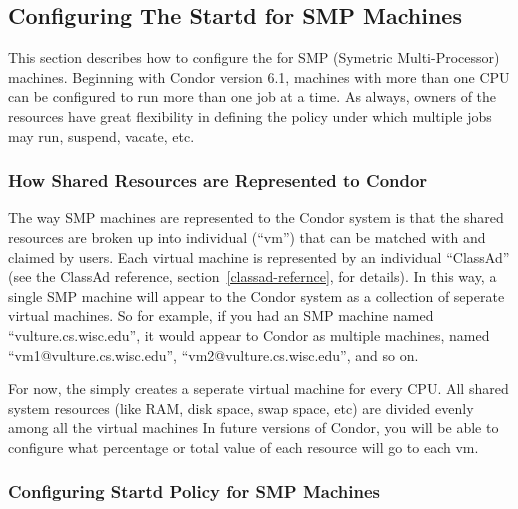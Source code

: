 \subsection{Configuring The Startd for SMP Machines}
\label{sec:Configuring-SMP}

This section describes how to configure the  for SMP
(Symetric Multi-Processor) machines.
Beginning with Condor version 6.1, machines with more than one CPU can
be configured to run more than one job at a time.
As always, owners of the resources have great flexibility in defining
the policy under which multiple jobs may run, suspend, vacate, etc.  

\subsubsection{How Shared Resources are Represented to Condor}
\label{sec:How-Resources-Represented}

The way SMP machines are represented to the Condor system is that
the shared resources are broken up into individual  (``vm'') that can be matched with and claimed by users.
Each virtual machine is represented by an individual ``ClassAd''
(see the ClassAd reference, section~\ref{classad-refernce}, for
details). 
In this way, a single SMP machine will appear to the Condor system as
a collection of seperate virtual machines.  
So for example, if you had an SMP machine named
``vulture.cs.wisc.edu'', it would appear to Condor as multiple
machines, named ``vm1@vulture.cs.wisc.edu'',
``vm2@vulture.cs.wisc.edu'', and so on.

For now, the  simply creates a seperate virtual machine
for every CPU.
All shared system resources (like RAM, disk space, swap space, etc)
are divided evenly among all the virtual machines
In future versions of Condor, you will be able to configure what
percentage or total value of each resource will go to each vm.  

\subsubsection{Configuring Startd Policy for SMP Machines}
\label{sec:Config-SMP-Policy}


